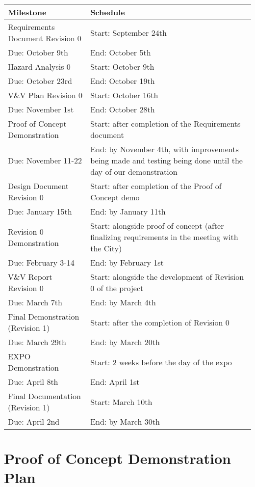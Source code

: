 \documentclass{article}
\begin{document}
\begin{longtable}{|m{4cm}|m{6cm}|}
\hline
\textbf{Milestone} & \textbf{Schedule}\\
\hline
Requirements Document Revision 0 & Start: September 24th\\
Due: October 9th & End: October 5th\\
\hline
Hazard Analysis 0 & Start: October 9th\\
Due: October 23rd & End: October 19th\\
\hline
V\&V Plan Revision 0 & Start: October 16th\\
Due: November 1st & End: October 28th\\
\hline
Proof of Concept Demonstration & Start: after completion of the Requirements document\\
Due: November 11-22 & End: by November 4th, with improvements being made and testing
being done until the day of our demonstration\\
\hline
Design Document Revision 0 & Start: after completion of the Proof of Concept demo\\
Due: January 15th & End: by January 11th\\
\hline
Revision 0 Demonstration & Start: alongside proof of concept (after finalizing requirements in the meeting with the City)\\
Due: February 3-14 & End: by February 1st\\
\hline
V\&V Report Revision 0 & Start: alongside the development of Revision 0 of the project\\
Due: March 7th & End: by March 4th\\
\hline
Final Demonstration (Revision 1) & Start: after the completion of Revision 0\\
Due: March 29th & End: by March 20th\\
\hline
EXPO Demonstration & Start: 2 weeks before the day of the expo\\
Due: April 8th & End: April 1st\\
\hline
Final Documentation (Revision 1) & Start: March 10th\\
Due: April 2nd & End: by March 30th\\
\hline
\end{longtable}

\section{Proof of Concept Demonstration Plan}
\end{document}

